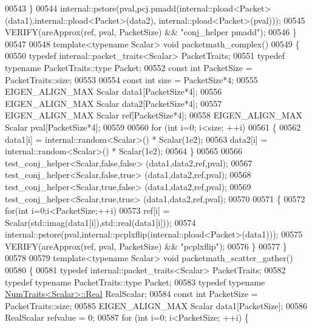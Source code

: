 \begin{DoxyCode}
00543   \}
00544   internal::pstore(pval,pcj.pmadd(internal::pload<Packet>(data1),internal::pload<Packet>(data2),
      internal::pload<Packet>(pval)));
00545   VERIFY(areApprox(ref, pval, PacketSize) && \textcolor{stringliteral}{"conj\_helper pmadd"});
00546 \}
00547 
00548 \textcolor{keyword}{template}<\textcolor{keyword}{typename} Scalar> \textcolor{keywordtype}{void} packetmath\_complex()
00549 \{
00550   \textcolor{keyword}{typedef} internal::packet\_traits<Scalar> PacketTraits;
00551   \textcolor{keyword}{typedef} \textcolor{keyword}{typename} PacketTraits::type Packet;
00552   \textcolor{keyword}{const} \textcolor{keywordtype}{int} PacketSize = PacketTraits::size;
00553 
00554   \textcolor{keyword}{const} \textcolor{keywordtype}{int} size = PacketSize*4;
00555   EIGEN\_ALIGN\_MAX Scalar data1[PacketSize*4];
00556   EIGEN\_ALIGN\_MAX Scalar data2[PacketSize*4];
00557   EIGEN\_ALIGN\_MAX Scalar ref[PacketSize*4];
00558   EIGEN\_ALIGN\_MAX Scalar pval[PacketSize*4];
00559 
00560   \textcolor{keywordflow}{for} (\textcolor{keywordtype}{int} i=0; i<size; ++i)
00561   \{
00562     data1[i] = internal::random<Scalar>() * Scalar(1e2);
00563     data2[i] = internal::random<Scalar>() * Scalar(1e2);
00564   \}
00565 
00566   test\_conj\_helper<Scalar,false,false> (data1,data2,ref,pval);
00567   test\_conj\_helper<Scalar,false,true>  (data1,data2,ref,pval);
00568   test\_conj\_helper<Scalar,true,false>  (data1,data2,ref,pval);
00569   test\_conj\_helper<Scalar,true,true>   (data1,data2,ref,pval);
00570 
00571   \{
00572     \textcolor{keywordflow}{for}(\textcolor{keywordtype}{int} i=0;i<PacketSize;++i)
00573       ref[i] = Scalar(std::imag(data1[i]),std::real(data1[i]));
00574     internal::pstore(pval,internal::pcplxflip(internal::pload<Packet>(data1)));
00575     VERIFY(areApprox(ref, pval, PacketSize) && \textcolor{stringliteral}{"pcplxflip"});
00576   \}
00577 \}
00578 
00579 \textcolor{keyword}{template}<\textcolor{keyword}{typename} Scalar> \textcolor{keywordtype}{void} packetmath\_scatter\_gather()
00580 \{
00581   \textcolor{keyword}{typedef} internal::packet\_traits<Scalar> PacketTraits;
00582   \textcolor{keyword}{typedef} \textcolor{keyword}{typename} PacketTraits::type Packet;
00583   \textcolor{keyword}{typedef} \textcolor{keyword}{typename} \hyperlink{group___core___module_struct_eigen_1_1_num_traits}{NumTraits<Scalar>::Real} RealScalar;
00584   \textcolor{keyword}{const} \textcolor{keywordtype}{int} PacketSize = PacketTraits::size;
00585   EIGEN\_ALIGN\_MAX Scalar data1[PacketSize];
00586   RealScalar refvalue = 0;
00587   \textcolor{keywordflow}{for} (\textcolor{keywordtype}{int} i=0; i<PacketSize; ++i) \{

\end{DoxyCode}
